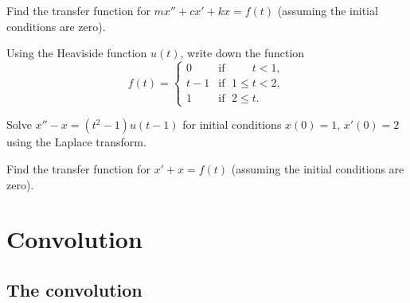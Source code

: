 \documentclass[12pt]{book}
\begin{document}
\begin{exercise}
Find the transfer function for 
$m x'' + c x' + kx = f(t)$
(assuming the initial conditions are zero).
\end{exercise}

\setcounter{exercise}{100}

\begin{exercise}
Using the Heaviside function $u(t)$, write down the function
\begin{equation*}
f(t) =
\begin{cases}
0 & \text{if } \; \phantom{1 \leq {}} t < 1  , \\
t-1 & \text{if } \; 1 \leq t < 2 , \\
1 & \text{if } \; 2 \leq t .
\end{cases}
\end{equation*}
\end{exercise}

\begin{exercise}
Solve $x''-x = (t^2-1) u(t-1)$ for initial conditions $x(0)=1$, $x'(0) = 2$
using the Laplace transform.
\end{exercise}
 
\begin{exercise}
Find the transfer function for 
$x' + x = f(t)$
(assuming the initial conditions are zero).
\end{exercise}


\sectionnewpage
\section{Convolution}


\subsection{The convolution}
\end{document}
